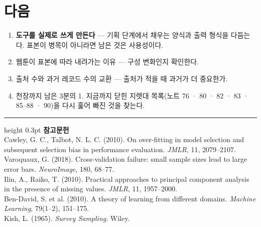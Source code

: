 \documentclass[10pt]{article}
\begin{document}
\section{다음}

\begin{enumerate}[leftmargin=1.3em,itemsep=0.15em]
\item \textbf{도구를 실제로 쓰게 만든다} --- 기획 단계에서 채우는 양식과
      출력 형식을 다듬는다. 표본이 병목이 아니라면 남은 것은 사용성이다.
\item 웹툰이 표본에 따라 내려가는 이유 --- 구성 변화인지 확인한다.
\item 출처 수와 과거 레코드 수의 교환 --- 출처가 적을 때 과거가 더 중요한가.
\item 천장까지 남은 3분의 1. 지금까지 닫힌 지렛대 목록(노트 76 · 80 · 82 ·
      83 · 85--88 · 90)을 다시 훑어 빠진 것을 찾는다.
\end{enumerate}

\vspace{0.6em}
\hrule height 0.3pt
\vspace{0.5em}
{\footnotesize
\textbf{참고문헌}\\[0.3em]
Cawley, G. C., Talbot, N. L. C. (2010). On over-fitting in model selection and
subsequent selection bias in performance evaluation. \emph{JMLR}, 11, 2079--2107.\\[0.15em]
Varoquaux, G. (2018). Cross-validation failure: small sample sizes lead to large
error bars. \emph{NeuroImage}, 180, 68--77.\\[0.15em]
Ilin, A., Raiko, T. (2010). Practical approaches to principal component analysis
in the presence of missing values. \emph{JMLR}, 11, 1957--2000.\\[0.15em]
Ben-David, S. et al. (2010). A theory of learning from different domains.
\emph{Machine Learning}, 79(1--2), 151--175.\\[0.15em]
Kish, L. (1965). \emph{Survey Sampling}. Wiley.
}
\end{document}
